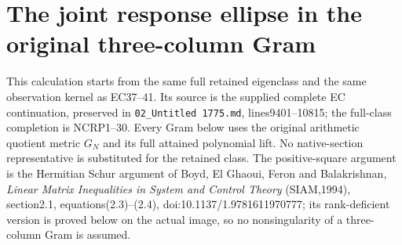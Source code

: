 \section{The joint response ellipse in the original three-column Gram}

This calculation starts from the same full retained eigenclass and the same
observation kernel as EC37--41. Its source is the supplied complete EC
continuation, preserved in \texttt{02\_Untitled 1775.md}, lines9401--10815;
the full-class completion is NCRP1--30. Every Gram below uses the original
arithmetic quotient metric $G_N$ and its full attained polynomial lift.
No native-section representative is substituted for the retained class.
The positive-square argument is the Hermitian Schur argument of
Boyd, El Ghaoui, Feron and Balakrishnan, \emph{Linear Matrix Inequalities
in System and Control Theory} (SIAM,1994), section2.1, equations(2.3)--(2.4),
doi:10.1137/1.9781611970777; its rank-deficient version is proved below
on the actual image, so no nonsingularity of a three-column Gram is assumed.


